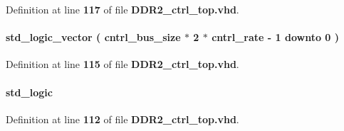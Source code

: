 Definition at line {\bf 117} of file {\bf D\+D\+R2\+\_\+ctrl\+\_\+top.\+vhd}.

\paragraph[{ddr2arb\+\_\+local\+\_\+wdata}]{ {\bfseries \textcolor{comment}{std\+\_\+logic\+\_\+vector}\textcolor{vhdlchar}{ }\textcolor{vhdlchar}{(}\textcolor{vhdlchar}{ }\textcolor{vhdlchar}{ }\textcolor{vhdlchar}{ }\textcolor{vhdlchar}{ }{\bfseries {\bf cntrl\+\_\+bus\+\_\+size}} \textcolor{vhdlchar}{$\ast$}\textcolor{vhdlchar}{ } \textcolor{vhdldigit}{2} \textcolor{vhdlchar}{$\ast$}\textcolor{vhdlchar}{ }\textcolor{vhdlchar}{ }\textcolor{vhdlchar}{ }{\bfseries {\bf cntrl\+\_\+rate}} \textcolor{vhdlchar}{-\/}\textcolor{vhdlchar}{ } \textcolor{vhdldigit}{1} \textcolor{vhdlchar}{ }\textcolor{keywordflow}{downto}\textcolor{vhdlchar}{ }\textcolor{vhdlchar}{ } \textcolor{vhdldigit}{0} \textcolor{vhdlchar}{ }\textcolor{vhdlchar}{)}\textcolor{vhdlchar}{ }} \hspace{0.3cm}{\ttfamily [Signal]}}\label{classDDR2__ctrl__top_1_1arch_a48ce1023631c1bef4318d1dd6c03d0b5}


Definition at line {\bf 115} of file {\bf D\+D\+R2\+\_\+ctrl\+\_\+top.\+vhd}.

\paragraph[{ddr2arb\+\_\+local\+\_\+write\+\_\+req}]{ {\bfseries \textcolor{comment}{std\+\_\+logic}\textcolor{vhdlchar}{ }} \hspace{0.3cm}{\ttfamily [Signal]}}\label{classDDR2__ctrl__top_1_1arch_a8537344857d4d2baa2421978e8818bda}


Definition at line {\bf 112} of file {\bf D\+D\+R2\+\_\+ctrl\+\_\+top.\+vhd}.


